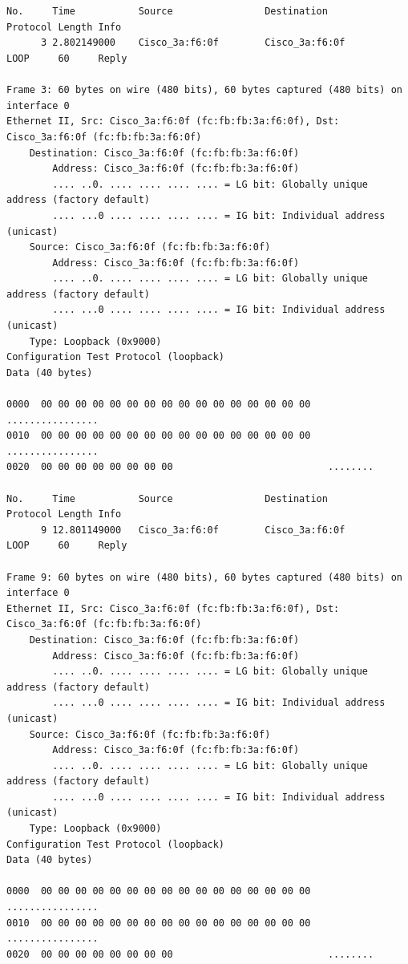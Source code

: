 \documentclass[a4paper,11pt]{article}
\begin{document}
\begin{lstlisting}


No.     Time           Source                Destination           Protocol Length Info
      3 2.802149000    Cisco_3a:f6:0f        Cisco_3a:f6:0f        LOOP     60     Reply

Frame 3: 60 bytes on wire (480 bits), 60 bytes captured (480 bits) on interface 0
Ethernet II, Src: Cisco_3a:f6:0f (fc:fb:fb:3a:f6:0f), Dst: Cisco_3a:f6:0f (fc:fb:fb:3a:f6:0f)
    Destination: Cisco_3a:f6:0f (fc:fb:fb:3a:f6:0f)
        Address: Cisco_3a:f6:0f (fc:fb:fb:3a:f6:0f)
        .... ..0. .... .... .... .... = LG bit: Globally unique address (factory default)
        .... ...0 .... .... .... .... = IG bit: Individual address (unicast)
    Source: Cisco_3a:f6:0f (fc:fb:fb:3a:f6:0f)
        Address: Cisco_3a:f6:0f (fc:fb:fb:3a:f6:0f)
        .... ..0. .... .... .... .... = LG bit: Globally unique address (factory default)
        .... ...0 .... .... .... .... = IG bit: Individual address (unicast)
    Type: Loopback (0x9000)
Configuration Test Protocol (loopback)
Data (40 bytes)

0000  00 00 00 00 00 00 00 00 00 00 00 00 00 00 00 00   ................
0010  00 00 00 00 00 00 00 00 00 00 00 00 00 00 00 00   ................
0020  00 00 00 00 00 00 00 00                           ........

No.     Time           Source                Destination           Protocol Length Info
      9 12.801149000   Cisco_3a:f6:0f        Cisco_3a:f6:0f        LOOP     60     Reply

Frame 9: 60 bytes on wire (480 bits), 60 bytes captured (480 bits) on interface 0
Ethernet II, Src: Cisco_3a:f6:0f (fc:fb:fb:3a:f6:0f), Dst: Cisco_3a:f6:0f (fc:fb:fb:3a:f6:0f)
    Destination: Cisco_3a:f6:0f (fc:fb:fb:3a:f6:0f)
        Address: Cisco_3a:f6:0f (fc:fb:fb:3a:f6:0f)
        .... ..0. .... .... .... .... = LG bit: Globally unique address (factory default)
        .... ...0 .... .... .... .... = IG bit: Individual address (unicast)
    Source: Cisco_3a:f6:0f (fc:fb:fb:3a:f6:0f)
        Address: Cisco_3a:f6:0f (fc:fb:fb:3a:f6:0f)
        .... ..0. .... .... .... .... = LG bit: Globally unique address (factory default)
        .... ...0 .... .... .... .... = IG bit: Individual address (unicast)
    Type: Loopback (0x9000)
Configuration Test Protocol (loopback)
Data (40 bytes)

0000  00 00 00 00 00 00 00 00 00 00 00 00 00 00 00 00   ................
0010  00 00 00 00 00 00 00 00 00 00 00 00 00 00 00 00   ................
0020  00 00 00 00 00 00 00 00                           ........


\end{lstlisting}
\end{document}
